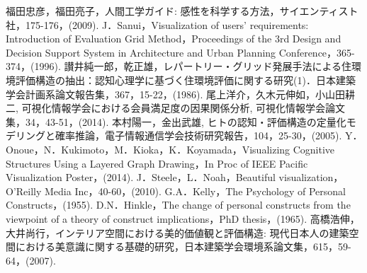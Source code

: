 \documentclass[syuuron]{kuee}
\begin{document}


\begin{thebibliography}{数字}
	 福田忠彦，福田亮子，人間工学ガイド: 感性を科学する方法，サイエンティスト社，175-176，(2009).
	 J．Sanui，Visualization of users' requirements: Introduction of Evaluation Grid Method，Proceedings of the 3rd Design and Decision Support System in Architecture and Urban Planning Conference，365-374，(1996).
	 讃井純一郎，乾正雄，レパートリー・グリッド発展手法による住環境評価構造の抽出：認知心理学に基づく住環境評価に関する研究(1)．日本建築学会計画系論文報告集，367，15-22，(1986).
	 尾上洋介，久木元伸如，小山田耕二, 可視化情報学会における会員満足度の因果関係分析, 可視化情報学会論文集，34，43-51，(2014).
	 本村陽一，金出武雄, ヒトの認知・評価構造の定量化モデリングと確率推論，電子情報通信学会技術研究報告，104，25-30，(2005).
	 Y．Onoue，N．Kukimoto，M．Kioka，K．Koyamada，Visualizing Cognitive Structures Using a Layered Graph Drawing，In Proc of IEEE Pacific Visualization Poster，(2014).
	 J．Steele，L．Noah，Beautiful visualization，O'Reilly Media Inc，40-60，(2010).
	 G.A．Kelly，The Psychology of Personal Constructs，(1955).
	 D.N．Hinkle，The change of personal constructs from the viewpoint of a theory of construct implications，PhD thesis，(1965).
	 高橋浩伸，大井尚行，インテリア空間における美的価値観と評価構造: 現代日本人の建築空間における美意識に関する基礎的研究，日本建築学会環境系論文集，615，59-64，(2007).
	

\end{thebibliography}
\end{document}
